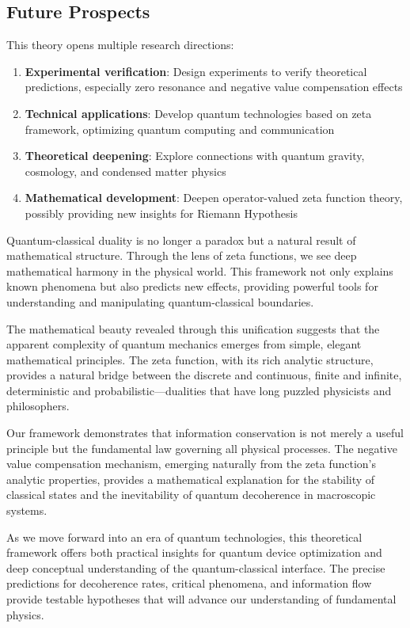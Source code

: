 \documentclass[11pt]{article}
\theoremstyle{plain}
\theoremstyle{definition}
\theoremstyle{remark}
\begin{document}
\subsection{Future Prospects}

This theory opens multiple research directions:

\begin{enumerate}
\item \textbf{Experimental verification}: Design experiments to verify theoretical predictions, especially zero resonance and negative value compensation effects
\item \textbf{Technical applications}: Develop quantum technologies based on zeta framework, optimizing quantum computing and communication
\item \textbf{Theoretical deepening}: Explore connections with quantum gravity, cosmology, and condensed matter physics
\item \textbf{Mathematical development}: Deepen operator-valued zeta function theory, possibly providing new insights for Riemann Hypothesis
\end{enumerate}

Quantum-classical duality is no longer a paradox but a natural result of mathematical structure. Through the lens of zeta functions, we see deep mathematical harmony in the physical world. This framework not only explains known phenomena but also predicts new effects, providing powerful tools for understanding and manipulating quantum-classical boundaries.

The mathematical beauty revealed through this unification suggests that the apparent complexity of quantum mechanics emerges from simple, elegant mathematical principles. The zeta function, with its rich analytic structure, provides a natural bridge between the discrete and continuous, finite and infinite, deterministic and probabilistic—dualities that have long puzzled physicists and philosophers.

Our framework demonstrates that information conservation is not merely a useful principle but the fundamental law governing all physical processes. The negative value compensation mechanism, emerging naturally from the zeta function's analytic properties, provides a mathematical explanation for the stability of classical states and the inevitability of quantum decoherence in macroscopic systems.

As we move forward into an era of quantum technologies, this theoretical framework offers both practical insights for quantum device optimization and deep conceptual understanding of the quantum-classical interface. The precise predictions for decoherence rates, critical phenomena, and information flow provide testable hypotheses that will advance our understanding of fundamental physics.
\end{document}
